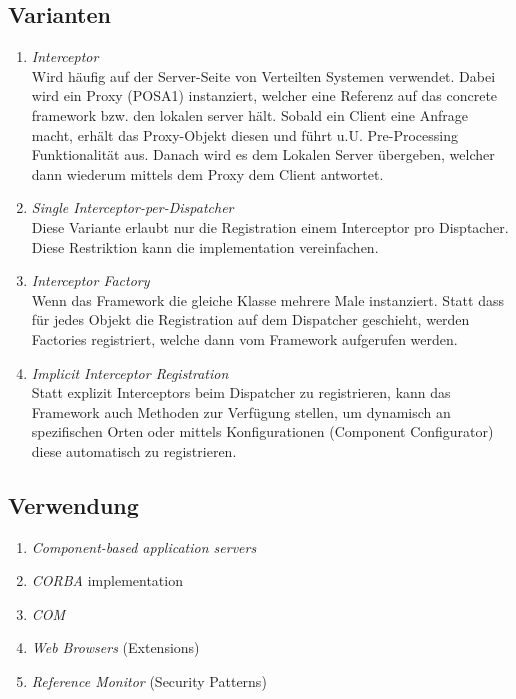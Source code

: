 \subsection{Varianten}
\begin{enumerate}
	\item \emph{Interceptor}\\
	Wird häufig auf der Server-Seite von Verteilten Systemen verwendet. Dabei wird ein Proxy (POSA1) instanziert, welcher eine Referenz auf das concrete framework bzw. den lokalen server hält. Sobald ein Client eine Anfrage macht, erhält das Proxy-Objekt diesen und führt u.U. Pre-Processing Funktionalität aus. Danach wird es dem Lokalen Server übergeben, welcher dann wiederum mittels dem Proxy dem Client antwortet.
	\item \emph{Single Interceptor-per-Dispatcher}\\
	Diese Variante erlaubt nur die Registration einem Interceptor pro Disptacher. Diese Restriktion kann die implementation vereinfachen.
	\item \emph{Interceptor Factory}\\
	Wenn das Framework die gleiche Klasse mehrere Male instanziert. Statt dass für jedes Objekt die Registration auf dem Dispatcher geschieht, werden Factories registriert, welche dann vom Framework aufgerufen werden.
	\item \emph{Implicit Interceptor Registration}\\
	Statt explizit Interceptors beim Dispatcher zu registrieren, kann das Framework auch Methoden zur Verfügung stellen, um dynamisch an spezifischen Orten oder mittels Konfigurationen (Component Configurator) diese automatisch zu registrieren.
\end{enumerate}


\subsection{Verwendung}

\begin{enumerate}
	\item \emph{Component-based application servers}
	\item \emph{CORBA} implementation
	\item \emph{COM}
	\item \emph{Web Browsers} (Extensions)
	\item \emph{Reference Monitor} (Security Patterns)
\end{enumerate}


